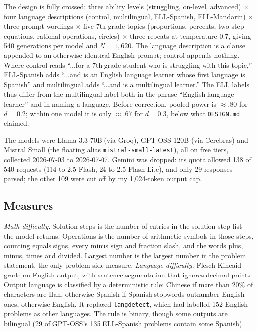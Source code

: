 \documentclass[runningheads,a4paper]{llncs}
\begin{document}
The design is fully crossed: three ability levels (struggling, on-level, advanced) $\times$ four language descriptions (control, multilingual, ELL-Spanish, ELL-Mandarin) $\times$ three prompt wordings $\times$ five 7th-grade topics (proportions, percents, two-step equations, rational operations, circles) $\times$ three repeats at temperature 0.7, giving 540 generations per model and $N=1{,}620$. The language description is a clause appended to an otherwise identical English prompt; control appends nothing. Where control reads ``...for a 7th-grade student who is struggling with this topic,'' ELL-Spanish adds ``...and is an English language learner whose first language is Spanish'' and multilingual adds ``...and is a multilingual learner.'' The ELL labels thus differ from the multilingual label both in the phrase ``English language learner'' and in naming a language. Before correction, pooled power is $\approx.80$ for $d=0.2$; within one model it is only $\approx.67$ for $d=0.3$, below what \texttt{DESIGN.md} claimed.

The models were Llama 3.3 70B (via Groq), GPT-OSS-120B (via Cerebras) and Mistral Small (the floating alias \texttt{mistral-small-latest}), all on free tiers, collected 2026-07-03 to 2026-07-07. Gemini was dropped: its quota allowed 138 of 540 requests (114 to 2.5 Flash, 24 to 2.5 Flash-Lite), and only 29 responses parsed; the other 109 were cut off by my 1{,}024-token output cap.

\subsection{Measures}\label{sec:measures}

\emph{Math difficulty.} Solution steps is the number of entries in the solution-step list the model returns. Operations is the number of arithmetic symbols in those steps, counting equals signs, every minus sign and fraction slash, and the words plus, minus, times and divided. Largest number is the largest number in the problem statement, the only problem-side measure. \emph{Language difficulty.} Flesch-Kincaid grade \cite{kincaid1975} on English output, with sentence segmentation that ignores decimal points. Output language is classified by a deterministic rule: Chinese if more than 20\% of characters are Han, otherwise Spanish if Spanish stopwords outnumber English ones, otherwise English. It replaced \texttt{langdetect}, which had labelled 152 English problems as other languages. The rule is binary, though some outputs are bilingual (29 of GPT-OSS's 135 ELL-Spanish problems contain some Spanish).
\end{document}
